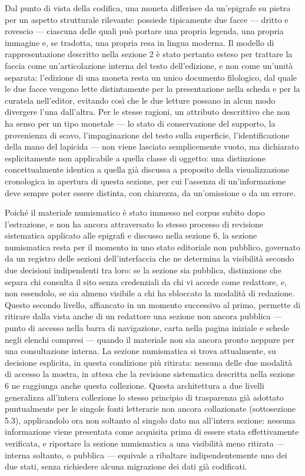 \documentclass[11pt,a4paper]{article}
\begin{document}
Dal punto di vista della codifica, una moneta differisce da
un'epigrafe su pietra per un aspetto strutturale rilevante: possiede
tipicamente due facce --- dritto e rovescio --- ciascuna delle quali
può portare una propria legenda, una propria immagine e, se tradotta,
una propria resa in lingua moderna. Il modello di rappresentazione
descritto nella sezione 2 è stato pertanto esteso per trattare la
faccia come un'articolazione interna del testo dell'edizione, e non
come un'unità separata: l'edizione di una moneta resta un unico
documento filologico, dal quale le due facce vengono lette
distintamente per la presentazione nella scheda e per la curatela
nell'editor, evitando così che le due letture possano in alcun modo
divergere l'una dall'altra. Per le stesse ragioni, un attributo
descrittivo che non ha senso per un tipo monetale --- lo stato di
conservazione del supporto, la provenienza di scavo, l'impaginazione
del testo sulla superficie, l'identificazione della mano del lapicida
--- non viene lasciato semplicemente vuoto, ma dichiarato
esplicitamente non applicabile a quella classe di oggetto: una
distinzione concettualmente identica a quella già discussa a proposito
della visualizzazione cronologica in apertura di questa sezione, per
cui l'assenza di un'informazione deve sempre poter essere distinta, con
chiarezza, da un'omissione o da un errore.

Poiché il materiale numismatico è stato immesso nel corpus subito dopo
l'estrazione, e non ha ancora attraversato lo stesso processo di
revisione sistematica applicato alle epigrafi e discusso nella sezione
6, la sezione numismatica resta per il momento in uno stato editoriale
non pubblico, governato da un registro delle sezioni dell'interfaccia
che ne determina la visibilità secondo due decisioni indipendenti tra
loro: se la sezione sia pubblica, distinzione che separa chi consulta
il sito senza credenziali da chi vi accede come redattore, e, non
essendolo, se sia almeno visibile a chi ha sbloccato la modalità di
redazione. Questo secondo livello, affiancato in un momento successivo
al primo, permette di ritirare dalla vista anche di un redattore una
sezione non ancora pubblica --- punto di accesso nella barra di
navigazione, carta nella pagina iniziale e schede negli elenchi
compresi --- quando il materiale non sia ancora pronto neppure per una
consultazione interna. La sezione numismatica si trova attualmente, su
decisione esplicita, in questa condizione più ritirata: nessuna delle
due modalità di accesso la mostra, in attesa che la revisione
sistematica descritta nella sezione 6 ne raggiunga anche questa
collezione. Questa architettura a due livelli generalizza all'intera
collezione lo stesso principio di trasparenza già adottato puntualmente
per le singole fonti letterarie non ancora collazionate (sottosezione
5.3), applicandolo ora non soltanto al singolo dato ma all'intera
sezione: nessuna informazione viene presentata come acquisita prima di
essere stata effettivamente verificata, e riportare la sezione
numismatica a una visibilità meno ritirata --- interna soltanto, o
pubblica --- equivale a ribaltare indipendentemente uno dei due stati,
senza richiedere alcuna migrazione dei dati già codificati.
\end{document}
